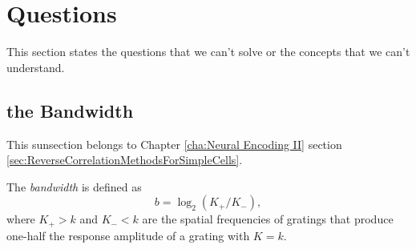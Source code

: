 
\section{Questions}
\label{sec:questions}

This section states the questions that we can't solve or the concepts that we can't understand.
\subsection{the Bandwidth}
\label{sec:bandwidth}
This sunsection belongs to Chapter \ref{cha:Neural Encoding II} section \ref{sec:ReverseCorrelationMethodsForSimpleCells}.

\begin{defn}
  The \emph{bandwidth} is defined as
  \begin{displaymath}
    b = \log_2(K_+/K_-),
  \end{displaymath}
  where $K_+ > k$ and $K_-<k$ are the spatial frequencies of gratings that produce one-half the response amplitude of a grating with $K=k$.
\end{defn}


